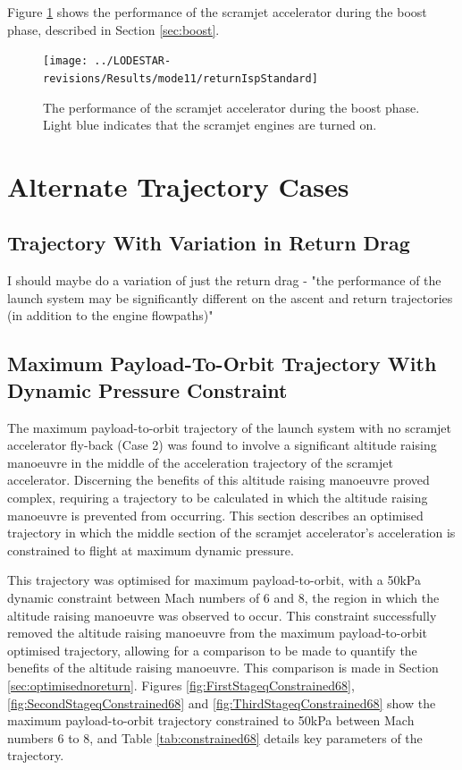 Figure \ref{fig:returnIspStandard} shows the performance of the scramjet accelerator during the boost phase, described in Section \ref{sec:boost}. 

\begin{figure}[ht]
	\centering
	\texttt{[image: ../LODESTAR-revisions/Results/mode11/returnIspStandard]}
	\caption{The performance of the scramjet accelerator during the boost phase. Light blue indicates that the scramjet engines are turned on.}
	\label{fig:returnIspStandard}
\end{figure}


		\chapter{Alternate Trajectory Cases}
		
		\section{Trajectory With Variation in Return Drag}
		I should maybe do a variation of just the return drag - "the performance of the launch system may be significantly different on the ascent and return trajectories (in addition to the engine flowpaths)"
		
		\section{Maximum Payload-To-Orbit Trajectory With Dynamic Pressure Constraint}\label{sec:Appendix_qconst}
	
		The maximum payload-to-orbit trajectory of the launch system with no scramjet accelerator fly-back (Case 2) was found to involve a significant altitude raising manoeuvre in the middle of the acceleration trajectory of the scramjet accelerator. Discerning the benefits of this altitude raising manoeuvre proved complex, requiring a trajectory to be calculated in which the altitude raising manoeuvre is prevented from occurring. This section describes an optimised trajectory in which the middle section of the scramjet accelerator's acceleration is constrained to flight at maximum dynamic pressure. 
		
		 This trajectory was optimised for maximum payload-to-orbit, with a 50kPa dynamic constraint between Mach numbers of 6 and 8, the region in which the altitude raising manoeuvre was observed to occur. This constraint successfully removed the altitude raising manoeuvre from the maximum payload-to-orbit optimised trajectory, allowing for a comparison to be made to quantify the benefits of the altitude raising manoeuvre. This comparison is made in Section \ref{sec:optimisednoreturn}. Figures \ref{fig:FirstStageqConstrained68},  \ref{fig:SecondStageqConstrained68} and \ref{fig:ThirdStageqConstrained68} show the maximum payload-to-orbit trajectory constrained to 50kPa between Mach numbers 6 to 8, and Table \ref{tab:constrained68} details key parameters of the trajectory. 
		
